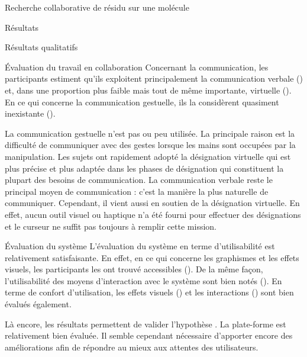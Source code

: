 \documentclass[myfrancais,ngerman,english,frenchb]{mythesis}
\begin{document}
\begin{mychapter}{Recherche collaborative de résidu sur une molécule}
\begin{mysection}{Résultats}
\begin{mysubsection}{Résultats qualitatifs}
\begin{mysubsubsection}{Évaluation du travail en collaboration}
					Concernant la communication, les participants estiment qu'ils exploitent principalement la communication verbale () et, dans une proportion plus faible mais tout de même importante, virtuelle ().
					En ce qui concerne la communication gestuelle, ils la considèrent quasiment inexistante ().

					La communication gestuelle n'est pas ou peu utilisée.
					La principale raison est la difficulté de communiquer avec des gestes lorsque les mains sont occupées par la manipulation.
					Les sujets ont rapidement adopté la désignation virtuelle qui est plus précise et plus adaptée dans les phases de désignation qui constituent la plupart des besoins de communication.
					La communication verbale reste le principal moyen de communication : c'est la manière la plus naturelle de communiquer.
					Cependant, il vient aussi en soutien de la désignation virtuelle.
					En effet, aucun outil visuel ou haptique n'a été fourni pour effectuer des désignations et le curseur ne suffit pas toujours à remplir cette mission.
				\end{mysubsubsection}
				\begin{mysubsubsection}{Évaluation du système}
					L'évaluation du système en terme d'utilisabilité est relativement satisfaisante.
					En effet, en ce qui concerne les graphismes et les effets visuels, les participants les ont trouvé accessibles ().
					De la même façon, l'utilisabilité des moyens d'interaction avec le système sont bien notés ().
					En terme de confort d'utilisation, les effets visuels () et les interactions () sont bien évalués également.

					Là encore, les résultats permettent de valider l'hypothèse .
					La plate-forme est relativement bien évaluée.
					Il semble cependant nécessaire d'apporter encore des améliorations afin de répondre au mieux aux attentes des utilisateurs.


\end{mysubsubsection}
\end{mysubsection}
\end{mysection}
\end{mychapter}
\end{document}
